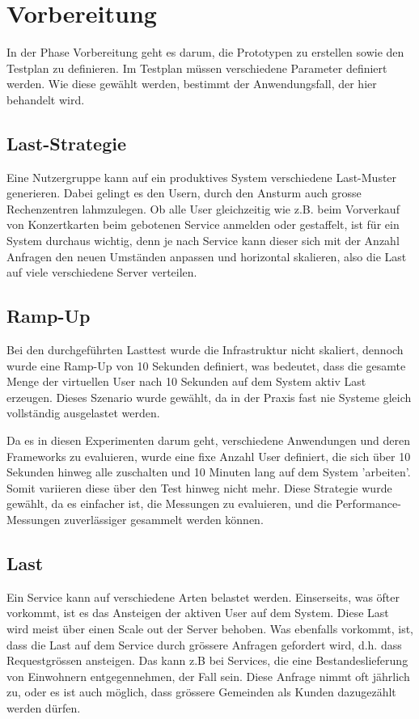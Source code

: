 \documentclass[main.tex]{subfiles}
\begin{document}
\section{Vorbereitung}
In der Phase Vorbereitung geht es darum, die Prototypen zu erstellen sowie den Testplan zu definieren. 
Im Testplan müssen verschiedene Parameter definiert werden. Wie diese gewählt werden, bestimmt der Anwendungsfall, der hier behandelt wird.

\subsection{Last-Strategie}
Eine Nutzergruppe kann auf ein produktives System verschiedene Last-Muster generieren. Dabei gelingt es den Usern, durch den Ansturm auch grosse Rechenzentren lahmzulegen. Ob alle User gleichzeitig wie z.B. beim Vorverkauf von Konzertkarten beim gebotenen Service anmelden oder gestaﬀelt, ist für ein System durchaus wichtig, denn je nach Service kann dieser sich mit der Anzahl Anfragen den neuen Umständen anpassen und horizontal skalieren, also die Last auf viele verschiedene Server verteilen.

\subsection{Ramp-Up}
Bei den durchgeführten Lasttest wurde die Infrastruktur nicht skaliert, dennoch wurde eine Ramp-Up von 10 Sekunden definiert, was bedeutet, dass die gesamte Menge der virtuellen User nach 10 Sekunden auf dem System aktiv Last erzeugen. Dieses Szenario wurde gewählt, da in der Praxis fast nie Systeme gleich vollständig ausgelastet werden.

Da es in diesen Experimenten darum geht, verschiedene Anwendungen und deren Frameworks zu evaluieren, wurde eine fixe Anzahl User definiert, die sich über 10 Sekunden hinweg alle zuschalten und 10 Minuten lang auf dem System ’arbeiten’. Somit variieren diese über den Test hinweg nicht mehr. Diese Strategie wurde gewählt, da es einfacher ist, die Messungen zu evaluieren, und die Performance-Messungen zuverlässiger gesammelt werden können. 

\subsection{Last}
Ein Service kann auf verschiedene Arten belastet werden. Einserseits, was öfter vorkommt, ist es das Ansteigen der aktiven User auf dem System. Diese Last wird meist über einen Scale out der Server behoben. Was ebenfalls vorkommt, ist, dass die Last auf dem Service durch grössere Anfragen gefordert wird, d.h. dass Requestgrössen ansteigen. Das kann z.B bei Services, die eine Bestandeslieferung von Einwohnern entgegennehmen, der Fall sein. Diese Anfrage nimmt oft jährlich zu, oder es ist auch möglich, dass grössere Gemeinden als Kunden dazugezählt werden dürfen. 
\end{document}
